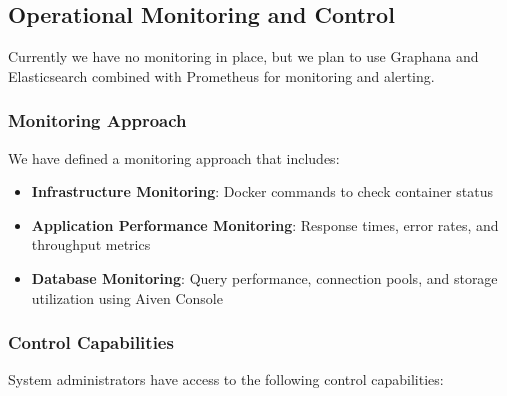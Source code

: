 
\subsection{Operational Monitoring and Control}

Currently we have no monitoring in place, but we plan to use Graphana and
Elasticsearch combined with Prometheus for monitoring and alerting.

\subsubsection{Monitoring Approach}

We have defined a monitoring approach that includes:

\begin{itemize}
    \item \textbf{Infrastructure Monitoring}: Docker commands to check container status
    \item \textbf{Application Performance Monitoring}: Response times, error rates, and throughput metrics
    \item \textbf{Database Monitoring}: Query performance, connection pools, and storage utilization using Aiven Console
\end{itemize}

\subsubsection{Control Capabilities}

System administrators have access to the following control capabilities:

